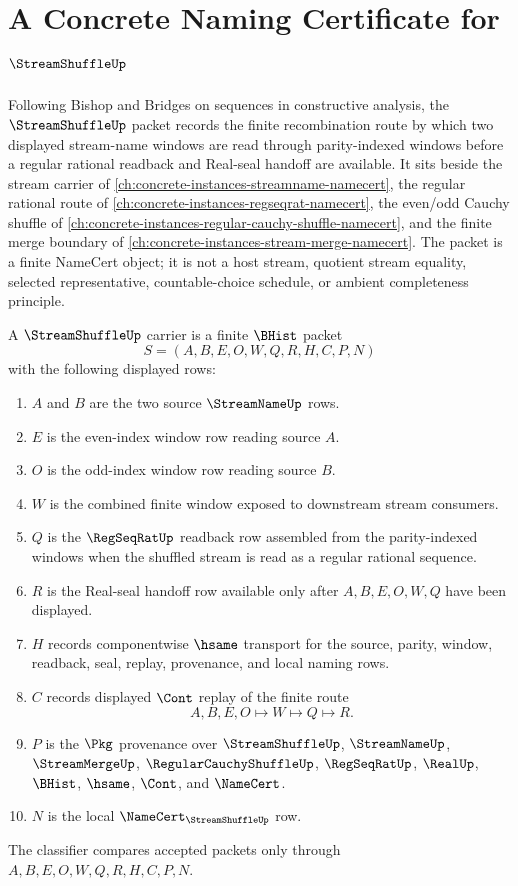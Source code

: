 \chapter{A Concrete Naming Certificate for $\StreamShuffleUp$}
\label{ch:concrete-instances-stream-shuffle-namecert}

Following Bishop and Bridges on sequences in constructive analysis, the
$\StreamShuffleUp$ packet records the finite recombination route by which two
displayed stream-name windows are read through parity-indexed windows before a
regular rational readback and Real-seal handoff are available. It sits beside
the stream carrier of \autoref{ch:concrete-instances-streamname-namecert}, the
regular rational route of \autoref{ch:concrete-instances-regseqrat-namecert},
the even/odd Cauchy shuffle of
\autoref{ch:concrete-instances-regular-cauchy-shuffle-namecert}, and the
finite merge boundary of \autoref{ch:concrete-instances-stream-merge-namecert}.
The packet is a finite NameCert object; it is not a host stream, quotient
stream equality, selected representative, countable-choice schedule, or
ambient completeness principle.

\begin{definition}
\label{def:stream-shuffle-carrier}
A $\StreamShuffleUp$ carrier is a finite $\BHist$ packet
$$
S=(A,B,E,O,W,Q,R,H,C,P,N)
$$
with the following displayed rows:
\begin{enumerate}
\item $A$ and $B$ are the two source $\StreamNameUp$ rows.
\item $E$ is the even-index window row reading source $A$.
\item $O$ is the odd-index window row reading source $B$.
\item $W$ is the combined finite window exposed to downstream stream
consumers.
\item $Q$ is the $\RegSeqRatUp$ readback row assembled from the parity-indexed
windows when the shuffled stream is read as a regular rational sequence.
\item $R$ is the Real-seal handoff row available only after $A,B,E,O,W,Q$ have
been displayed.
\item $H$ records componentwise $\hsame$ transport for the source, parity,
window, readback, seal, replay, provenance, and local naming rows.
\item $C$ records displayed $\Cont$ replay of the finite route
$$
A,B,E,O \longmapsto W \longmapsto Q \longmapsto R .
$$
\item $P$ is the $\Pkg$ provenance over $\StreamShuffleUp$, $\StreamNameUp$,
$\StreamMergeUp$, $\RegularCauchyShuffleUp$, $\RegSeqRatUp$, $\RealUp$,
$\BHist$, $\hsame$, $\Cont$, and $\NameCert$.
\item $N$ is the local $\NameCert_{\StreamShuffleUp}$ row.
\end{enumerate}
The classifier compares accepted packets only through
$A,B,E,O,W,Q,R,H,C,P,N$.
\end{definition}

